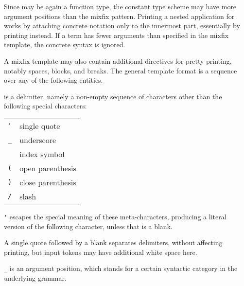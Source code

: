 \begin{isabellebody}
\begin{isamarkuptext}
  Since \isa{{\isachardoublequote}{\isasymtau}{\isachardoublequote}} may be again a function type, the constant
  type scheme may have more argument positions than the mixfix
  pattern.  Printing a nested application  for
   works by attaching concrete notation only to the
  innermost part, essentially by printing 
  instead.  If a term has fewer arguments than specified in the mixfix
  template, the concrete syntax is ignored.

  \medskip A mixfix template may also contain additional directives
  for pretty printing, notably spaces, blocks, and breaks.  The
  general template format is a sequence over any of the following
  entities.

  \begin{description}

  \item {} is a delimiter, namely a non-empty sequence of
  characters other than the following special characters:

  \smallskip
  \begin{tabular}{ll}
    \verb|'| & single quote \\
    \verb|_| & underscore \\
    \isa{{\isachardoublequote}{\isasymindex}{\isachardoublequote}} & index symbol \\
    \verb|(| & open parenthesis \\
    \verb|)| & close parenthesis \\
    \verb|/| & slash \\
  \end{tabular}
  \medskip

  \item \verb|'| escapes the special meaning of these
  meta-characters, producing a literal version of the following
  character, unless that is a blank.

  A single quote followed by a blank separates delimiters, without
  affecting printing, but input tokens may have additional white space
  here.

  \item \verb|_| is an argument position, which stands for a
  certain syntactic category in the underlying grammar.


\end{description}
\end{isamarkuptext}
\end{isabellebody}
